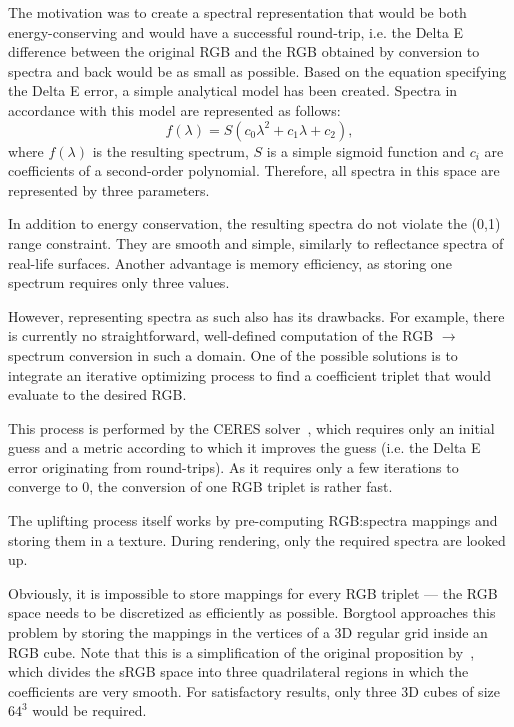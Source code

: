 The motivation was to create a spectral representation that would be both energy-conserving and would have a successful round-trip, i.e. the Delta E difference between the original RGB and the RGB obtained by conversion to spectra and back would be as small as possible. Based on the equation specifying the Delta E error, a simple analytical model has been created. Spectra in accordance with this model are represented as follows:
\begin{equation} \label{sigmoidRepresentation}
f(\lambda)=S(c_{0}\lambda^2+c_{1}\lambda+c_{2}),
\end{equation}
where $f(\lambda)$ is the resulting spectrum, $S$ is a simple sigmoid function and $c_{i}$ are coefficients of a second-order polynomial. Therefore, all spectra in this space are represented by three parameters.

In addition to energy conservation, the resulting spectra do not violate the (0,1) range constraint. They are smooth and simple, similarly to reflectance spectra of real-life surfaces. Another advantage is memory efficiency, as storing one spectrum requires only three values.

However, representing spectra as such also has its drawbacks. For example, there is currently no straightforward, well-defined computation of the RGB $\to$ spectrum conversion in such a domain. One of the possible solutions is to integrate an iterative optimizing process to find a coefficient triplet that would evaluate to the desired RGB.

This process is performed by the CERES solver~\cite{ceres-solver}, which requires only an initial guess and a metric according to which it improves the guess (i.e. the Delta E error originating from round-trips). As it requires only a few iterations to converge to 0, the conversion of one RGB triplet is rather fast.

The uplifting process itself works by pre-computing RGB:spectra mappings and storing them in a texture. During rendering, only the required spectra are looked up.

Obviously, it is impossible to store mappings for every RGB triplet --- the RGB space needs to be discretized as efficiently as possible. Borgtool approaches this problem by storing the mappings in the vertices of a 3D regular grid inside an RGB cube. Note that this is a simplification of the original proposition by~\citet{upsamplingJakobHanika}, which divides the sRGB space into three quadrilateral regions in which the coefficients are very smooth. For satisfactory results, only three 3D cubes of size $64^3$ would be required.

